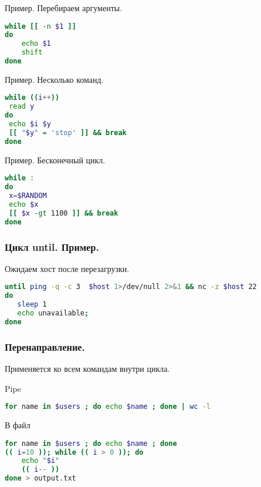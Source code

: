 \begin{frame}[fragile]
\frametitle{}

\begin{block}{Пример. Перебираем аргументы.}
\begin{lstlisting}[language=sh,frame=single]
while [[ -n $1 ]]
do
    echo $1
    shift
done
\end{lstlisting}
\end{block}

\begin{block}{Пример. Несколько команд.}
\begin{lstlisting}[language=sh,frame=single]
while ((i++))
 read y
do
 echo $i $y
 [[ "$y" = 'stop' ]] && break
done
\end{lstlisting}
\end{block}
\begin{block}{Пример. Бесконечный цикл.}
\begin{lstlisting}[language=sh,frame=single]
while :
do
 x=$RANDOM
 echo $x
 [[ $x -gt 1100 ]] && break
done
\end{lstlisting}
\end{block}
\end{frame}

\begin{frame}[fragile]
\frametitle{ Цикл until. Пример.}
  \begin{block}{Ожидаем хост после перезагрузки.}
    \begin{lstlisting}[language=sh,frame=single]
until ping -q -c 3  $host 1>/dev/null 2>&1 && nc -z $host 22
do 
   sleep 1
   echo unavailable;
done
    \end{lstlisting}
  \end{block}
\end{frame}

\begin{frame}[fragile]
\frametitle{Перенаправление.}
Применяется ко всем командам внутри цикла.
  \begin{block}{Pipe}
    \begin{lstlisting}[language=sh,frame=single]
for name in $users ; do echo $name ; done | wc -l
    \end{lstlisting}
  \end{block}
  \begin{block}{В файл}
    \begin{lstlisting}[language=sh,frame=single]
for name in $users ; do echo $name ; done
(( i=10 )); while (( i > 0 )); do 
    echo "$i"
    (( i-- ))
done > output.txt
    \end{lstlisting}
  \end{block}
\end{frame}

